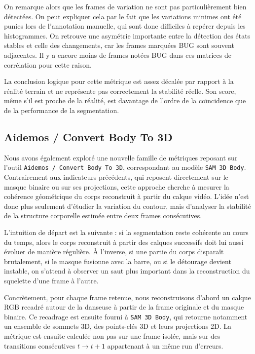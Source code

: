 \documentclass[11pt,a4paper]{article}
\begin{document}
On remarque alors que les frames de variation ne sont pas particulièrement bien détectées. On peut expliquer cela par le fait que les variations minimes ont été punies lors de l'annotation manuelle, qui sont donc difficiles à repérer depuis les histogrammes.
On retrouve une asymétrie importante entre la détection des états stables et celle des changements, car les frames marquées BUG sont souvent adjacentes.
Il y a encore moins de frames notées BUG dans ces matrices de corrélation pour cette raison.

La conclusion logique pour cette métrique est assez décalée par rapport à la réalité terrain et ne représente pas correctement la stabilité réelle. Son score, même s'il est proche de la réalité, est davantage de l'ordre de la coïncidence que de la performance de la segmentation.

\subsection{Aidemos / Convert Body To 3D}
Nous avons également exploré une nouvelle famille de métriques reposant sur l'outil \texttt{Aidemos / Convert Body To 3D}, correspondant au modèle \texttt{SAM 3D Body}. Contrairement aux indicateurs précédents, qui reposent directement sur le masque binaire ou sur ses projections, cette approche cherche à mesurer la cohérence géométrique du corps reconstruit à partir du calque vidéo. L'idée n'est donc plus seulement d'étudier la variation du contour, mais d'analyser la stabilité de la structure corporelle estimée entre deux frames consécutives.

L'intuition de départ est la suivante : si la segmentation reste cohérente au cours du temps, alors le corps reconstruit à partir des calques successifs doit lui aussi évoluer de manière régulière. À l'inverse, si une partie du corps disparaît brutalement, si le masque fusionne avec la barre, ou si le détourage devient instable, on s'attend à observer un saut plus important dans la reconstruction du squelette d'une frame à l'autre.

Concrètement, pour chaque frame retenue, nous reconstruisons d'abord un calque RGB recadré autour de la danseuse à partir de la frame originale et du masque binaire. Ce recadrage est ensuite fourni à \texttt{SAM 3D Body}, qui retourne notamment un ensemble de sommets 3D, des points-clés 3D et leurs projections 2D. La métrique est ensuite calculée non pas sur une frame isolée, mais sur des transitions consécutives $t \rightarrow t+1$ appartenant à un même run d'erreurs.
\end{document}
